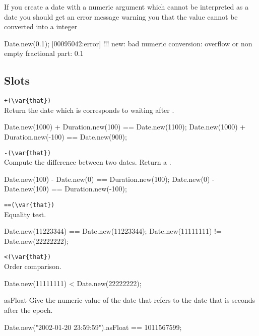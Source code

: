 If you create a date with a numeric argument which cannot be interpreted as
a date you should get an error message warning you that the value cannot be
converted into a integer

\begin{urbiscript}
Date.new(0.1);
[00095042:error] !!! new: bad numeric conversion: overflow or non empty fractional part: 0.1
\end{urbiscript}

\subsection{Slots}

\begin{urbiscriptapi}
\item \lstinline|+(\var{that})|\\
  Return the date which is corresponds to waiting 
   after \this.
\begin{urbiassert}
Date.new(1000) + Duration.new(100) == Date.new(1100);
Date.new(1000) + Duration.new(-100) == Date.new(900);
\end{urbiassert}

\item \lstinline|-(\var{that})|\\
  Compute the difference between two dates.  Return a
  .
\begin{urbiassert}
Date.new(100) - Date.new(0) == Duration.new(100);
Date.new(0) - Date.new(100) == Duration.new(-100);
\end{urbiassert}

\item \lstinline|==(\var{that})|\\
  Equality test.
\begin{urbiassert}
Date.new(11223344) == Date.new(11223344);
Date.new(11111111) != Date.new(22222222);
\end{urbiassert}

\item \lstinline|<(\var{that})|\\
  Order comparison.
\begin{urbiassert}
Date.new(11111111) < Date.new(22222222);
\end{urbiassert}

\item[asFloat]
  Give the numeric value of the date that refers to the date that is 
seconds after the epoch.
\begin{urbiassert}
Date.new("2002-01-20 23:59:59").asFloat == 1011567599;
\end{urbiassert}


\end{urbiscriptapi}
